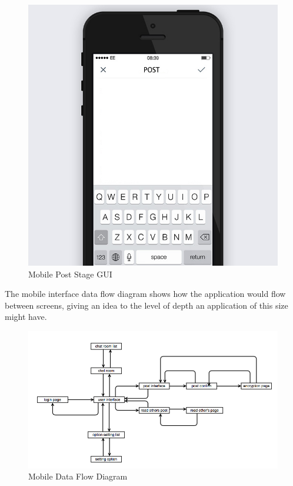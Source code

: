 \begin{figure}[H]
    \centering
    \includegraphics[width=\textwidth]{images/design/mobile_post.jpg}
    \caption{Mobile Post Stage GUI}
    \label{fig:mobile_post}
\end{figure}

The mobile interface data flow diagram shows how the application would flow 
between screens, giving an idea to the level of depth an application of this 
size might have.

\begin{figure}[h]
    \centering
    \includegraphics[width=\textwidth]{images/design/mobile_flow_diag.png}
    \caption{Mobile Data Flow Diagram}
    \label{fig:mobile_flow}
\end{figure}
